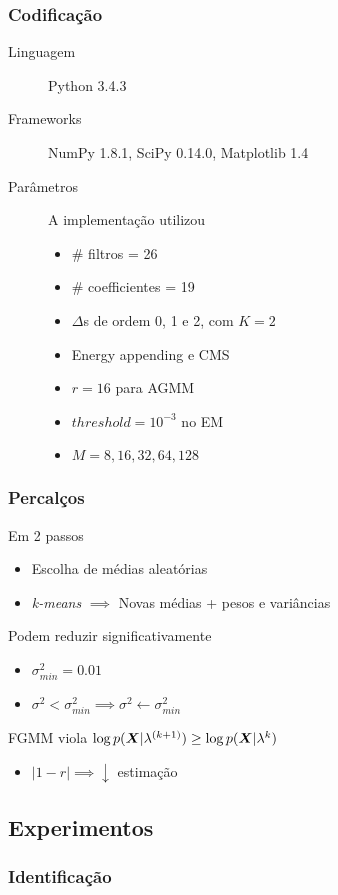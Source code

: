 \begin{frame}
\frametitle{Codificação}
\begin{description}
    \item[Linguagem] Python 3.4.3
    \pause
    \item[Frameworks] NumPy 1.8.1, SciPy 0.14.0, Matplotlib 1.4
    \pause
    \item[Parâmetros] A implementação utilizou
    \pause
    \begin{itemize}
        \item \# filtros = 26
        \pause
        \item \# coefficientes = 19
        \pause
        \item $\Delta$s de ordem 0, 1 e 2, com $K = 2$
        \pause
        \item Energy appending e CMS
        \pause
        \item $r = 16$ para AGMM
        \pause
        \item $threshold = 10^{-3}$ no EM
        \pause
        \item $M = 8, 16, 32, 64, 128$
    \end{itemize}
\end{description}
\end{frame}

\begin{frame}
\frametitle{Percalços}
\begin{description}\itemsep6pt
    \item[Inicialização] Em 2 passos
    \pause
    \begin{itemize}
        \item Escolha de médias aleatórias
        \pause
        \item \emph{k-means} $\implies$ Novas médias + pesos e variâncias
        \pause
    \end{itemize}
    \item[Variâncias] Podem reduzir significativamente
    \pause
    \begin{itemize}\itemsep4pt
        \item $\sigma_{min}^2 = 0.01$
        \pause
        \item $\sigma^2 < \sigma_{min}^2 \implies \sigma^2 \gets \sigma_{min}^2$
        \pause
    \end{itemize}
    \item[$\overline{Monotonic}$] FGMM viola $\log p(\boldsymbol{X}|\lambda^{(k+1)}) \geq \log p(\boldsymbol{X}|\lambda^{k})$
    \begin{itemize}\itemsep4pt
        \item $|1 - r| \implies \downarrow$ estimação
    \end{itemize}
\end{description}
\end{frame}

\subsection{Experimentos}

\begin{frame}
\frametitle{Identificação}
\end{frame}